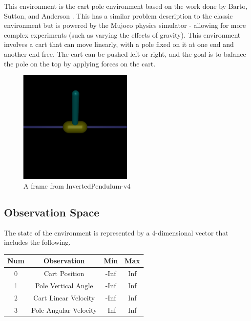 \documentclass{article} %
\begin{document}
This environment is the cart pole environment based on the work done by Barto, Sutton, and Anderson \cite{barto1983neuronlike}. This has a similar problem description to the classic environment but is powered by the Mujoco physics simulator - allowing for more complex experiments (such as varying the effects of gravity). This environment involves a cart that can move linearly, with a pole fixed on it at one end and another end free. The cart can be pushed left or right, and the goal is to balance the pole on the top by applying forces on the cart.

\begin{figure}[h]
    \begin{center}
        \includegraphics[width=0.5\textwidth]{inverted_pendulum.png}
    \end{center}
    \caption{A frame from InvertedPendulum-v4}
    \label{fig:invpendulum-rendering}
\end{figure}

\subsection{Observation Space}
The state of the environment is represented by a 4-dimensional vector that includes the following.

\begin{center}
    \begin{tabular}{cccc}
        \toprule
        Num & Observation & Min & Max \\
        \midrule
        0 & Cart Position & -Inf & Inf \\
        1 & Pole Vertical Angle & -Inf & Inf \\
        2 & Cart Linear Velocity & -Inf & Inf \\
        3 & Pole Angular Velocity & -Inf & Inf \\
        \bottomrule
    \end{tabular}
\end{center}
\end{document}
